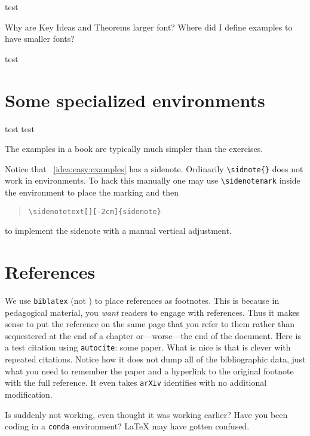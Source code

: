 \begin{example}[named]
    test
\end{example}
\begin{bigidea}
    Why are Key Ideas and Theorems larger font? Where did I define examples to have smaller fonts?
\end{bigidea}
\begin{bigidea}[named]
    test
\end{bigidea}


\section{Some specialized environments}

{\firalight test} {\firabook test}

\begin{bigidea}
\label{idea:easy:examples}
The examples in a book are typically much simpler than the exercises.\sidenotemark
\end{bigidea}

\noindent  Notice that \bigidearef{}~\ref{idea:easy:examples} has a sidenote. Ordinarily \verb!\sidnote{}! does not work in environments. To hack this manually one may use \verb!\sidenotemark! inside the environment to place the marking and then 
\begin{quotation}
\verb!\sidenotetext[][-2cm]{sidenote}!
\end{quotation}
to implement the sidenote with a manual vertical adjustment.



\section{References}

We use \texttt{biblatex} (not \BibTeX{}) to place references as footnotes. This is because in pedagogical material, you \emph{want} readers to engage with references. Thus it makes sense to put the reference on the same page that you refer to them rather than sequestered at the end of a chapter or---worse---the end of the document. Here is a test citation using \texttt{autocite}: some paper.\autocite{Feng:2016ijc} What is nice is that \BibLaTeX{} is clever with repeated citations.\autocite{Feng:2016ijc} Notice how it does not dump all of the bibliographic data, just what you need to remember the paper and a hyperlink to the original footnote with the full reference. It even takes \texttt{arXiv} identifies with no additional modification.


\begin{flipcomment}
Is \BibLaTeX{} suddenly not working, even thought it was working earlier? Have you been coding in a \texttt{conda} environment? \LaTeX{} may have gotten confused.
\end{flipcomment}
